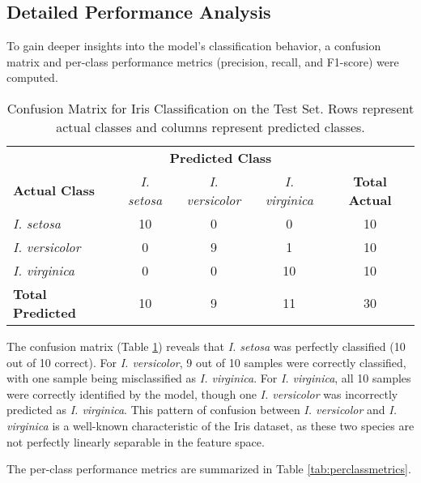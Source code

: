 \documentclass[12pt,a4paper]{article}
\begin{document}
	\subsection{Detailed Performance Analysis}
	To gain deeper insights into the model's classification behavior, a confusion matrix and per-class performance metrics (precision, recall, and F1-score) were computed.
	
	\begin{table}[h!]
		\centering
		\caption{Confusion Matrix for Iris Classification on the Test Set. Rows represent actual classes and columns represent predicted classes.}
		\label{tab:confmat}
		\begin{tabular}{@{}lcccc@{}}
			\toprule
			& \multicolumn{3}{c}{\textbf{Predicted Class}} \\
			\cmidrule(l){2-4}
			\textbf{Actual Class} & \textit{I. setosa} & \textit{I. versicolor} & \textit{I. virginica} & \textbf{Total Actual} \\ \midrule
			\textit{I. setosa}    & 10               & 0                    & 0                   & 10 \\
			\textit{I. versicolor} & 0                & 9                    & 1                   & 10 \\
			\textit{I. virginica}  & 0                & 0                    & 10                  & 10 \\ \midrule
			\textbf{Total Predicted} & 10 & 9 & 11 & 30 \\
			\bottomrule
		\end{tabular}
	\end{table}
	
	The confusion matrix (Table \ref{tab:confmat}) reveals that \textit{I. setosa} was perfectly classified (10 out of 10 correct). For \textit{I. versicolor}, 9 out of 10 samples were correctly classified, with one sample being misclassified as \textit{I. virginica}. For \textit{I. virginica}, all 10 samples were correctly identified by the model, though one \textit{I. versicolor} was incorrectly predicted as \textit{I. virginica}. This pattern of confusion between \textit{I. versicolor} and \textit{I. virginica} is a well-known characteristic of the Iris dataset, as these two species are not perfectly linearly separable in the feature space.
	
	The per-class performance metrics are summarized in Table \ref{tab:perclassmetrics}.
	
\end{document}
